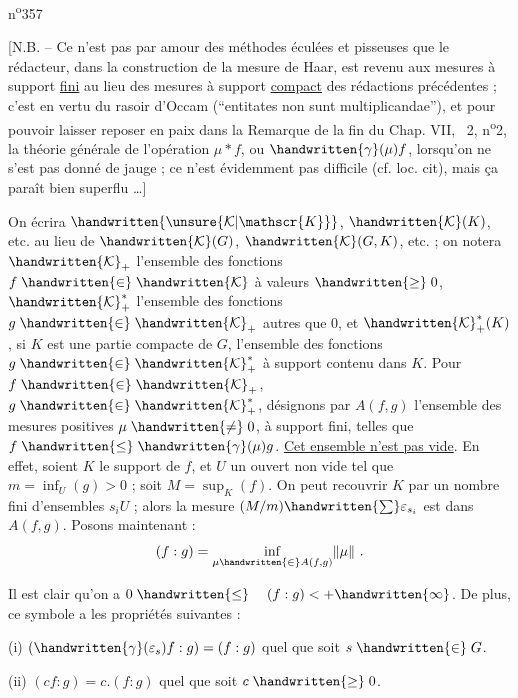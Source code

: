 n\textsuperscript{o}357

[N.B. -- Ce n'est pas par amour des méthodes éculées et pisseuses que le rédacteur, dans la construction de la mesure de Haar, est revenu aux mesures à support \uline{fini} au lieu des mesures à support \uline{compact} des rédactions précédentes ; c'est en vertu du rasoir d'Occam (``entitates non sunt multiplicandae''), et pour pouvoir laisser reposer en paix dans la Remarque de la fin du Chap. VII, \handwritten{\S}\ 2, n\textsuperscript{o}2, la théorie générale de l'opération $\mu\ast f$, ou $\handwritten{\gamma}(\mu)f$, lorsqu'on ne s'est pas donné de jauge ; ce n'est évidemment pas difficile (cf. loc. cit), mais ça paraît bien superflu \ldots]

On écrira $\handwritten{\unsure{\mathcal{K}|\mathscr{K}}}$, $\handwritten{\mathcal{K}}(K)$, etc. au lieu de $\handwritten{\mathcal{K}}(G)$, $\handwritten{\mathcal{K}}(G,K)$, etc. ; on notera $\handwritten{\mathcal{K}}_+$ l'ensemble des fonctions $f\mathrel{\handwritten{\in}}\handwritten{\mathcal{K}}$ à valeurs $\mathrel{\handwritten{\geq}}0$, $\handwritten{\mathcal{K}}^{\ast}_{+}$ l'ensemble des fonctions $g\mathrel{\handwritten{\in}}\handwritten{\mathcal{K}}_+$ autres que $0$, et $\handwritten{\mathcal{K}}^{\ast}_{+}(K)$, si $K$ est une partie compacte de $G$, l'ensemble des fonctions $g\mathrel{\handwritten{\in}}\handwritten{\mathcal{K}}^{\ast}_{+}$ à support contenu dans $K$. Pour $f\mathrel{\handwritten{\in}}\handwritten{\mathcal{K}}_+$, $g\mathrel{\handwritten{\in}}\handwritten{\mathcal{K}}^{\ast}_{+}$, désignons par $A(f,g)$ l'ensemble des mesures positives $\mu\mathrel{\handwritten{\ne}}0$, à support fini, telles que $f\mathrel{\handwritten{\leq}}\handwritten{\gamma}(\mu)g$. \uline{Cet ensemble n'est pas vide}. En effet, soient $K$ le support de $f$, et $U$ un ouvert non vide tel que $m=\inf_U(g)>0$ ; soit $M=\sup_K(f)$. On peut recouvrir $K$ par un nombre fini d'ensembles $s_i U$ ; alors la mesure $(M/m)\handwritten{\sum}\varepsilon_{s_i}$ est dans $A(f,g)$. Posons maintenant :
\[
(f:g)=\inf_{\mu\mathrel{\handwritten{\in}} A(f,g)}\lVert\mu\rVert\ .
\]

Il est clair qu'on a $0\mathrel{\handwritten{\leq}}\quad(f:g)<+\handwritten{\infty}$. De plus, ce symbole a les propriétés suivantes :

(i) \quad $(\handwritten{\gamma}(\varepsilon_s)f:g)=(f:g)$ quel que soit $s\mathrel{\handwritten{\in}}G$.

(ii) \quad $(cf:g)=c.(f:g)$ quel que soit $c\mathrel{\handwritten{\geq}}0$.

